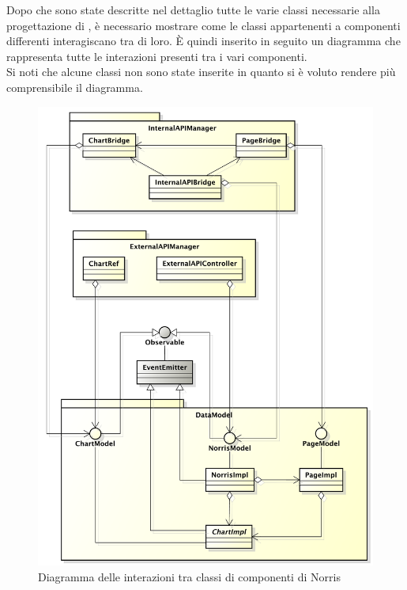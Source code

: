 	Dopo che sono state descritte nel dettaglio tutte le varie classi necessarie alla progettazione di , è necessario mostrare come le classi appartenenti a componenti differenti interagiscano tra di loro. È quindi inserito in seguito un diagramma  che rappresenta tutte le interazioni presenti tra i vari componenti.\\
	Si noti che alcune classi non sono state inserite in quanto si è voluto rendere più comprensibile il diagramma.
	\begin{figure}[H]\centering
		\includegraphics[width=\textwidth]{SpecificaTecnica/Pics/InterazioniComponentiNorris.pdf}
		\caption{Diagramma delle interazioni tra classi di componenti di Norris}
	\end{figure}
